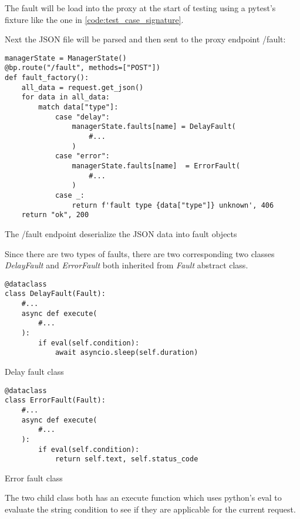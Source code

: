 The fault will be load into the proxy at the start of testing using a pytest's 
fixture like the one in \ref{code:test_case_signature}.

Next the JSON file will be parsed and then sent to the proxy endpoint /fault:

\begin{listing}[H]
  \begin{verbatim}
managerState = ManagerState()
@bp.route("/fault", methods=["POST"])
def fault_factory():
    all_data = request.get_json()
    for data in all_data:
        match data["type"]:
            case "delay":
                managerState.faults[name] = DelayFault(
                    #...
                )
            case "error":
                managerState.faults[name]  = ErrorFault(
                    #...
                )
            case _:
                return f'fault type {data["type"]} unknown', 406
    return "ok", 200
  \end{verbatim}
  \caption{The /fault endpoint deserialize the JSON data into fault objects}
\end{listing}


Since there are two types of faults, there are two corresponding two classes 
\textit{DelayFault} and \textit{ErrorFault} both inherited from \textit{Fault}
abstract class.

\begin{multicols}{2}
  \begin{listing}[H]
  \begin{verbatim}
@dataclass
class DelayFault(Fault):
    #...
    async def execute(
        #...
    ): 
        if eval(self.condition):
            await asyncio.sleep(self.duration)
  \end{verbatim}
  \caption{Delay fault class}
\end{listing}

  \columnbreak

  \begin{listing}[H]
  \begin{verbatim}
@dataclass
class ErrorFault(Fault):
    #...
    async def execute(
        #...
    ):
        if eval(self.condition):
            return self.text, self.status_code
  \end{verbatim}
  \caption{Error fault class}
\end{listing}
\end{multicols}

The two child class both has an execute function which uses python's eval to 
evaluate the string condition to see if they are applicable for the current request.

